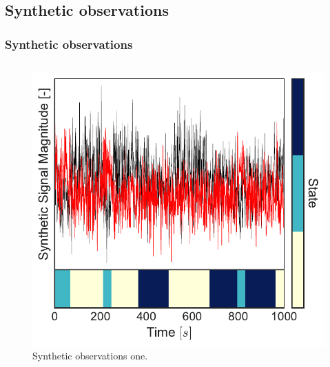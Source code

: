 \documentclass[aspectratio=169]{beamer}
\begin{document}
\subsection{Synthetic observations}
\begin{frame}
    \frametitle{Synthetic observations}

    \begin{columns}[c] 


        \begin{figure}
            \includegraphics[width=1.0\linewidth]{synthetic-data-plot-data1.pdf}
            \caption{Synthetic observations one.}
        \end{figure}



\end{columns}
\end{frame}
\end{document}
